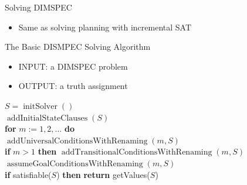 \documentclass[t]{sdqbeamer}
\begin{document}
\begin{frame}{Solving DIMSPEC}
\begin{itemize}
\item Same as solving planning with incremental SAT
\end{itemize}
\begin{block}{The Basic DISMPEC Solving Algorithm}
\begin{itemize}
	\item INPUT: a DIMSPEC problem
	\item OUTPUT: a truth assignment
\end{itemize}
$S = \operatorname{initSolver}()$ \\
$\operatorname{addInitialStateClauses}(S)$\\
\textbf{for} $m:=1,2,\dots$ \textbf{do}\\
\hspace{1em} $\operatorname{addUniversalConditionsWithRenaming}(m, S)$\\
\hspace{1em} \textbf{if} $m > 1$ \textbf{then} $\operatorname{addTransitionalConditionsWithRenaming}(m, S)$\\
\hspace{1em} $\operatorname{assumeGoalConditionsWithRenaming}(m, S)$\\
\hspace{1em} \textbf{if} satisfiable($S$) \textbf{then} \textbf{return} getValues($S$)\\
\end{block}
\end{frame}
\end{document}
